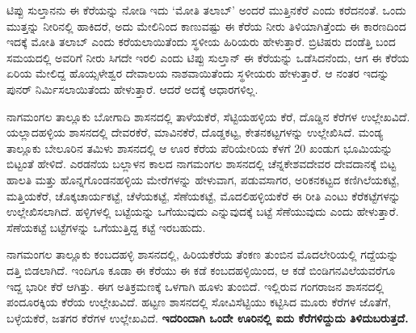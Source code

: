 \newpage

ಟಿಪ್ಪು ಸುಲ್ತಾನನು ಈ ಕೆರೆಯನ್ನು ನೋಡಿ ಇದು ‘ಮೋತಿ ತಲಾಬ್’ ಅಂದರೆ ಮುತ್ತಿನಕೆರೆ ಎಂದು ಕರೆದನಂತೆ. ಒಂದು ಮುತ್ತನ್ನು ನೀರಿನಲ್ಲಿ ಹಾಕಿದರೆ, ಅದು ಮೇಲಿನಿಂದ ಕಾಣುವಷ್ಟು ಈ ಕೆರೆಯ ನೀರು ತಿಳಿಯಾಗಿತ್ತೆಂದು ಈ ಕಾರಣದಿಂದ ಇದಕ್ಕೆ ಮೋತಿ ತಲಾಬ್ ಎಂದು ಕರೆಯಲಾಯಿತೆಂದು ಸ್ಥಳೀಯ ಹಿರಿಯರು ಹೇಳುತ್ತಾರೆ. ಬ್ರಿಟಿಷರು ದಂಡೆತ್ತಿ ಬಂದ ಸಮಯದಲ್ಲಿ ಅವರಿಗೆ ನೀರು ಸಿಗದೇ ಇರಲಿ ಎಂದು ಟಿಪ್ಪು ಸುಲ್ತಾನ್ ಈ ಕೆರೆಯನ್ನು ಒಡೆಸಿದನೆಂದು, ಆಗ ಈ ಕೆರೆಯ ಏರಿಯ ಮೇಲಿದ್ದ ಹೊಯ್ಸಳೇಶ್ವರ ದೇವಾಲಯ ನಾಶವಾಯಿತೆಂದು ಸ್ಥಳೀಯರು ಹೇಳುತ್ತಾರೆ. ಆ ನಂತರ ಇದನ್ನು ಪುನರ್ ನಿರ್ಮಿಸಲಾಯಿತೆಂದು ಹೇಳುತ್ತಾರೆ. ಆದರೆ ಅದಕ್ಕೆ ಆಧಾರಗಳಿಲ್ಲ.

\vskip 2pt

ನಾಗಮಂಗಲ ತಾಲ್ಲೂಕು ಬೋಗಾದಿ ಶಾಸನದಲ್ಲಿ ತಾಳೆಯಕೆರೆ, ಸೆಟ್ಟಿಯಹಳ್ಳಿಯ ಕೆರೆ, ದೊಡ್ಡಿನ ಕೆರೆಗಳ ಉಲ್ಲೇಖ\-ವಿದೆ. ಯಲ್ಲಾದಹಳ್ಳಿಯ ಶಾಸನದಲ್ಲಿ ದೇವರಕೆರೆ, ಮಾವಿನಕೆರೆ, ದೊಡ್ಡಕಟ್ಟ, ಕೇತನಕಟ್ಟಗಳನ್ನು ಉಲ್ಲೇಖಿಸಿದೆ. ಮಂಡ್ಯ ತಾಲ್ಲೂಕು ಬೇಲೂರಿನ ತಮಿಳು ಶಾಸನದಲ್ಲಿ ಆ ಊರ ಕೆರೆಯ ಪೆರಿಯೇರಿಯ ಕೆಳಗೆ 20 ಖಂಡುಗ ಭೂಮಿಯನ್ನು ಬಿಟ್ಟಂತೆ ಹೇಳಿದೆ. ಎರಡನೆಯ ಬಲ್ಲಾಳನ ಕಾಲದ ನಾಗಮಂಗಲ ಶಾಸನದಲ್ಲಿ ಚೆನ್ನಕೇಶವದೇವರ ದೇವದಾನಕ್ಕೆ ಬಿಟ್ಟ ಹಾಲತಿ ಮತ್ತು ಹೊನ್ನಗೊಂಡನಹಳ್ಳಿಯ ಮೇರೆಗಳನ್ನು ಹೇಳುವಾಗ, ಪಡುವಸಾಗರ, ಅರಿಕನಕಟ್ಟದ ಕಣಿಗಿಲೆಯಕಟ್ಟೆ, ಮತ್ತಿಯಕೆರೆ, ಚೊಕ್ಕಚಾರ್ಯಕಟ್ಟೆ, ಚೆಳೆಯಕಟ್ಟೆ, ಸೆಣೆಯಕಟ್ಟೆ, ಮೊದಲಿಹಳ್ಳಿಯಕೆರೆ ಈ ರೀತಿ ಎಂಟು ಕೆರೆಕಟ್ಟೆಗಳನ್ನು ಉಲ್ಲೇಖಿಸಲಾಗಿದೆ. ಹಳ್ಳಿಗಳಲ್ಲಿ ಬಟ್ಟೆಯನ್ನು ಒಗೆಯುವುದು ಎನ್ನುವುದಕ್ಕೆ ಬಟ್ಟೆ ಸೆಣೆಯುವುದು ಎಂದು ಹೇಳುತ್ತಾರೆ. ಸೆಣೆಯಕಟ್ಟೆ ಬಟ್ಟೆಗಳನ್ನು ಒಗೆಯುತ್ತಿದ್ದ ಕಟ್ಟೆ ಇರಬಹುದು.

\vskip 2pt

ನಾಗಮಂಗಲ ತಾಲ್ಲೂಕು ಕಂಬದಹಳ್ಳಿ ಶಾಸನದಲ್ಲಿ, ಹಿರಿಯಕೆರೆಯ ತೆಂಕಣ ತುಂಬಿನ ಮೊದಲೇರಿಯಲ್ಲಿ ಗದ್ದೆಯನ್ನು ದತ್ತಿ ಬಿಡಲಾಗಿದೆ. ಇಂದಿಗೂ ಕೂಡಾ ಈ ಕೆರೆಯು ಈ ಕಡೆ ಕಂಬದಹಳ್ಳಿಯಿಂದ, ಆ ಕಡೆ ಬಿಂಡಿಗನವಿಲೆಯವರೆಗೂ ಇದ್ದ ಭಾರೀ ಕೆರೆ ಆಗಿತ್ತು. ಈಗ ಅತಿಕ್ರಮಣಕ್ಕೆ ಒಳಗಾಗಿ ಹೂಳು ತುಂಬಿದೆ. ಇಲ್ಲಿರುವ ಗಂಗರಾಜನ ಶಾಸನದಲ್ಲಿ ಪಂದೂರಕ್ಕಿಯ ಕೆರೆಯ ಉಲ್ಲೇಖವಿದೆ. ಹಟ್ಟಣ ಶಾಸನದಲ್ಲಿ ಸೋವಿಸೆಟ್ಟಿಯು ಕಟ್ಟಿಸಿದ ಮೂರು ಕೆರೆಗಳ ಜೊತೆಗೆ, ಬಳ್ಳೆಯಕೆರೆ, ಜತಗರ ಕೆರೆಗಳ ಉಲ್ಲೇಖವಿದೆ. \textbf{ಇದರಿಂದಾಗಿ ಒಂದೇ ಊರಿನಲ್ಲಿ ಐದು ಕೆರೆಗಳಿದ್ದುದು ತಿಳಿದುಬರುತ್ತದೆ.}

\vskip 2pt

